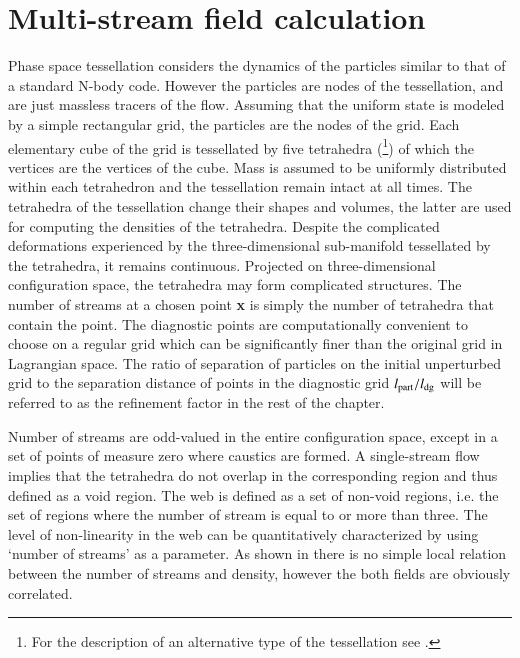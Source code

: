 \section{Multi-stream field calculation}
\label{subsec:method}

Phase space tessellation considers the dynamics of the particles similar to that of a standard N-body code. 
However the particles are nodes of the tessellation, and are just massless tracers of the flow.
Assuming that the uniform state is modeled by a simple rectangular grid, the particles are the nodes of the grid.
Each elementary cube of the grid is tessellated by five tetrahedra (\citealt{Shandarin2012}\footnote{For the description of an alternative type of the tessellation see \citet{Abel2012}.}) of which the vertices are the
vertices of the cube. Mass is assumed to be uniformly distributed within each tetrahedron and the tessellation remain
intact at all times. The tetrahedra of the tessellation change their shapes and volumes, the latter are used for
computing the densities of the tetrahedra. Despite the complicated deformations experienced by the three-dimensional
sub-manifold tessellated by the tetrahedra, it remains continuous. Projected on three-dimensional configuration space, the tetrahedra
may form complicated structures. The number of streams at a chosen point {\bf x} is simply the number of tetrahedra that contain the point. The diagnostic points are computationally convenient to choose on a regular grid which can be significantly finer than the original grid in Lagrangian space. The ratio of separation of particles on the initial unperturbed grid to the separation distance of points in the diagnostic grid  $l_{\rm part}/l_{\rm dg} $ will be referred to as the refinement factor in the rest of the chapter.

Number of streams are odd-valued in the entire configuration space, except in a set of points of measure zero where caustics are formed.  
 A single-stream flow implies that the tetrahedra do not overlap in the corresponding region and thus defined as a void region.
 The web is defined as a set of non-void regions, i.e. the set of regions where the number of stream is equal to or more than three.
 The level of non-linearity in the web  can be quantitatively characterized by using `number of streams' as a parameter. As shown in  \citep{Shandarin2012} there is no simple local relation between the number of streams and density, however the both
 fields are obviously correlated.

